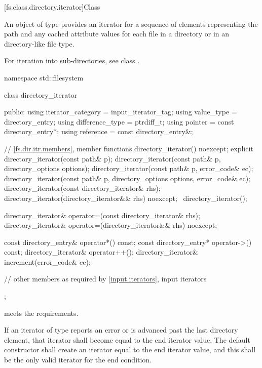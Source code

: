 [fs.class.directory.iterator]{Class }

%
\pnum
An object of type  provides an iterator for a
sequence of  elements representing the
path and any cached attribute values
for each file in a directory
or in an  directory-like file type.
\begin{note}
For iteration into sub-directories, see class .
\end{note}

\begin{codeblock}
namespace std::filesystem {
  class directory_iterator {
  public:
    using iterator_category = input_iterator_tag;
    using value_type        = directory_entry;
    using difference_type   = ptrdiff_t;
    using pointer           = const directory_entry*;
    using reference         = const directory_entry&;

    // \ref{fs.dir.itr.members}, member functions
    directory_iterator() noexcept;
    explicit directory_iterator(const path& p);
    directory_iterator(const path& p, directory_options options);
    directory_iterator(const path& p, error_code& ec);
    directory_iterator(const path& p, directory_options options,
                       error_code& ec);
    directory_iterator(const directory_iterator& rhs);
    directory_iterator(directory_iterator&& rhs) noexcept;
    ~directory_iterator();

    directory_iterator& operator=(const directory_iterator& rhs);
    directory_iterator& operator=(directory_iterator&& rhs) noexcept;

    const directory_entry& operator*() const;
    const directory_entry* operator->() const;
    directory_iterator&    operator++();
    directory_iterator&    increment(error_code& ec);

    // other members as required by \ref{input.iterators}, input iterators
  };
}
\end{codeblock}

\pnum
{} meets the
 requirements.

\pnum
If an iterator of type  reports an error or
is advanced past the last directory element,
that iterator shall become equal to the end iterator
value. The  default constructor shall
create an iterator equal to the end iterator value, and this shall be the only
valid iterator for the end condition.

